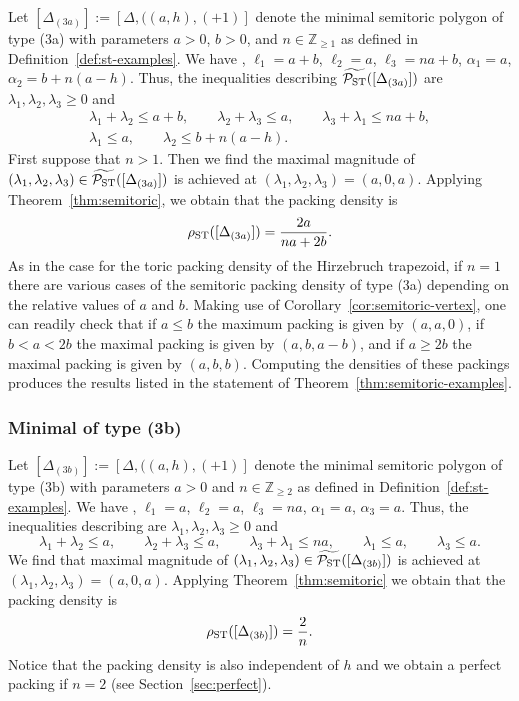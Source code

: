 \documentclass[10pt,a4paper]{amsart}
\numberwithin{equation}{section}
\def\Z{{\mathbb Z}}
\newcommand{\De}{\Delta}
\newcommand{\PSTtilde}{\widetilde{\mathcal{P}_{\rm ST}}}
\theoremstyle{definition}
\theoremstyle{plain}
\theoremstyle{plain}
\begin{document}
Let $[\De_{(3a)}]:=[\De,((a,h),(+1)]$ denote the minimal semitoric polygon of type (3a) with parameters $a>0$, $b>0$, and $n\in\Z_{\geq 1}$ as defined in Definition~\ref{def:st-examples}. We have \smash{$\textrm{area}(\De) = \frac{(na+2b)a}{2}$}, $\ell_1 = a+b$, $\ell_2 = a$, $\ell_3 = na+b$, $\alpha_1 = a$, $\alpha_2 = b+n(a-h)$. Thus, the inequalities describing $\PSTtilde([\De_{(3a)}])$ are $\lambda_1,\lambda_2,\lambda_3\geq 0$ and
\begin{gather*}
\lambda_1+\lambda_2 \leq a+b,\qquad
 \lambda_2+\lambda_3 \leq a,\qquad
 \lambda_3+\lambda_1 \leq na+b,\\
 \lambda_1 \leq a,\qquad
 \lambda_2 \leq b+n(a-h).
\end{gather*}
First suppose that $n>1$. Then we find the maximal magnitude of $(\lambda_1,\lambda_2,\lambda_3)\in\PSTtilde([\De_{(3a)}])$ is achieved at $(\lambda_1,\lambda_2,\lambda_3) = (a,0,a)$. Applying Theorem~\ref{thm:semitoric}, we obtain that the packing density is
\begin{equation}\label{eqn:stpack-3a}
\rho_{{\rm ST}} ([\De_{(3a)}]) = \frac{2a}{na+2b}.
\end{equation}
As in the case for the toric packing density of the Hirzebruch trapezoid, if $n=1$ there are various cases of the semitoric packing density of type (3a) depending on the relative values of $a$ and $b$.
Making use of Corollary~\ref{cor:semitoric-vertex}, one can readily check that if $a\leq b$ the maximum packing is given by $(a,a,0)$, if $b<a<2b$ the maximal packing is given by $(a, b, a-b)$, and if $a\geq 2b$ the maximal packing is given by $(a,b,b)$. Computing the densities of these packings produces the results listed in the statement of Theorem~\ref{thm:semitoric-examples}.

\subsubsection{Minimal of type (3b)}
Let $[\De_{(3b)}]:=[\De,((a,h),(+1)]$ denote the minimal semitoric polygon of type (3b) with parameters $a>0$ and $n\in\Z_{\geq 2}$ as defined in Definition~\ref{def:st-examples}. We have \smash{$\textrm{area}(\De) = \frac{na^2}{2}$}, $\ell_1 = a$, $\ell_2 = a$, $\ell_3 = na$, $\alpha_1 = a$, $\alpha_3 = a$. Thus, the inequalities describing \smash{$\PSTtilde([\De_{(3b)}])$} are $\lambda_1,\lambda_2,\lambda_3\geq 0$ and
\begin{equation*}
\lambda_1+\lambda_2 \leq a,\qquad
 \lambda_2+\lambda_3 \leq a,\qquad
 \lambda_3+\lambda_1 \leq na,\qquad
 \lambda_1 \leq a,\qquad
 \lambda_3 \leq a.
\end{equation*}
We find that maximal magnitude of $(\lambda_1,\lambda_2,\lambda_3)\in\PSTtilde([\De_{(3b)}])$ is achieved at $(\lambda_1,\lambda_2,\lambda_3) = (a,0,a)$. Applying Theorem~\ref{thm:semitoric} we obtain that the packing density is
\begin{equation}\label{eqn:stpack-3b}
\rho_{{\rm ST}} ([\De_{(3b)}]) = \frac{2}{n}.
\end{equation}
Notice that the packing density is also independent of $h$ and we obtain a perfect packing if $n=2$ (see Section~\ref{sec:perfect}).
\end{document}
